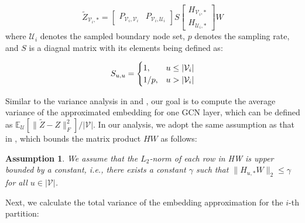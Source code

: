 \documentclass{article}
\newtheorem{assumption}{Assumption}[section]
\newcommand{\expe}{\mathbb{E}}
\begin{document}
$$\tilde{Z}_{\mathcal{V}_i,*}=
\begin{bmatrix}
P_{\mathcal{V}_i,\mathcal{V}_i} & P_{\mathcal{V}_i,\mathcal{U}_i}
\end{bmatrix}
S
\begin{bmatrix}
H_{\mathcal{V}_i,*}\\
H_{\mathcal{U}_i,*}
\end{bmatrix}W$$
where $\mathcal{U}_i$ denotes the sampled boundary node set, $p$ denotes the sampling rate, and $S$ is a diagnal matrix with its elements being defined as: 

\begin{align}
S_{u,u}=\begin{cases}
    1,     & u\leq|\mathcal{V}_i|\notag\\
    1/p,   & u>|\mathcal{V}_i|
\end{cases}
\end{align}

Similar to the variance analysis in \citep{chen2018stochastic} and \citep{zou2019layer}, our goal is to compute the average variance of the approximated embedding for one GCN layer, which can be defined as $\expe_{\mathcal{U}}[\|\tilde{Z}-Z\|_F^2]/|\mathcal{V}|$. In our analysis, we adopt the same assumption as that in \citep{zou2019layer}, which bounds the matrix product $HW$ as follows: 


\begin{assumption}
\label{asm:hw}
We assume that the $L_2$-norm of each row in HW is upper bounded by a constant, i.e.,
there exists a constant $\gamma$ such that $\|H_{u,*}W\|_2 \leq\gamma$ for all $u\in \left|\mathcal{V}\right|$.
\end{assumption}

Next, we calculate the total variance of the embedding approximation for the $i$-th partition:


\allowdisplaybreaks
\end{document}
